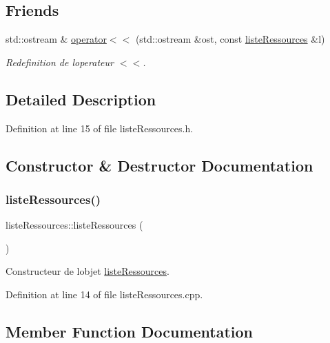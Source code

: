 \subsection*{Friends}
\begin{DoxyCompactItemize}
\item 
std\+::ostream \& \hyperlink{classliste_ressources_ad87802e9dc9dc83dfe95474945063d24}{operator$<$$<$} (std\+::ostream \&ost, const \hyperlink{classliste_ressources}{liste\+Ressources} \&l)
\begin{DoxyCompactList}\small\item\em Redefinition de l\textquotesingle{}operateur $<$$<$. \end{DoxyCompactList}\end{DoxyCompactItemize}


\subsection{Detailed Description}


Definition at line 15 of file liste\+Ressources.\+h.



\subsection{Constructor \& Destructor Documentation}
\hypertarget{classliste_ressources_a3f49a0916898d200295e0e6593253e73}{}\label{classliste_ressources_a3f49a0916898d200295e0e6593253e73} 
\subsubsection{\texorpdfstring{liste\+Ressources()}{listeRessources()}}
{\footnotesize\ttfamily liste\+Ressources\+::liste\+Ressources (\begin{DoxyParamCaption}{ }\end{DoxyParamCaption})}



Constructeur de l\textquotesingle{}objet \hyperlink{classliste_ressources}{liste\+Ressources}. 



Definition at line 14 of file liste\+Ressources.\+cpp.



\subsection{Member Function Documentation}
\hypertarget{classliste_ressources_a8459ff3010ad07d1ec5b23d73fad6911}{}\label{classliste_ressources_a8459ff3010ad07d1ec5b23d73fad6911} 
